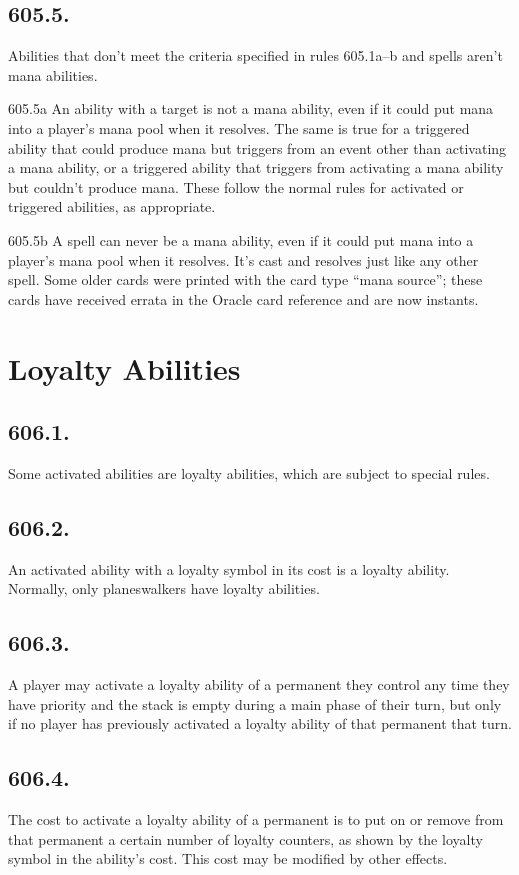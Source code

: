 \subsection*{605.5.}
Abilities that don’t meet the criteria specified in rules 605.1a–b and spells aren’t mana abilities.

605.5a An ability with a target is not a mana ability, even if it could put mana into a player’s mana pool when it resolves. The same is true for a triggered ability that could produce mana but triggers from an event other than activating a mana ability, or a triggered ability that triggers from activating a mana ability but couldn’t produce mana. These follow the normal rules for activated or triggered abilities, as appropriate.

605.5b A spell can never be a mana ability, even if it could put mana into a player’s mana pool when it resolves. It’s cast and resolves just like any other spell. Some older cards were printed with the card type “mana source”; these cards have received errata in the Oracle card reference and are now instants.

\section{Loyalty Abilities}
\subsection*{606.1.}
Some activated abilities are loyalty abilities, which are subject to special rules.

\subsection*{606.2.}
An activated ability with a loyalty symbol in its cost is a loyalty ability. Normally, only planeswalkers have loyalty abilities.

\subsection*{606.3.}
A player may activate a loyalty ability of a permanent they control any time they have priority and the stack is empty during a main phase of their turn, but only if no player has previously activated a loyalty ability of that permanent that turn.

\subsection*{606.4.}
The cost to activate a loyalty ability of a permanent is to put on or remove from that permanent a certain number of loyalty counters, as shown by the loyalty symbol in the ability’s cost. This cost may be modified by other effects.

